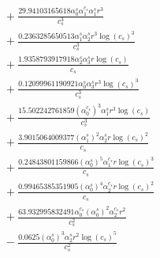\documentclass[10pt]{article}
\begin{document}
\begin{align*}
&{}  + \frac{29.94103165618 \alpha_{0}^s \alpha_{1}^{c_s} \alpha_{1}^s r^{3}}{c_{s}^{3}} \\
&{}  + \frac{0.2363285650513 \alpha_{1}^s \alpha_{2}^s r^{3} \log{\left(c_{s} \right)}^{3}}{c_{s}^{3}} \\
&{}  + \frac{1.9358793917918 \alpha_{2}^s \alpha_{3}^s r \log{\left(c_{s} \right)}}{c_{s}} \\
&{}  + \frac{0.12099961190921 \alpha_{0}^s \alpha_{3}^s r^{3} \log{\left(c_{s} \right)}^{3}}{c_{s}^{3}} \\
&{}  + \frac{15.502242761859 \left(\alpha_{0}^{c_s}\right)^{3} \alpha_{1}^s r^{3} \log{\left(c_{s} \right)}}{c_{s}^{3}} \\
&{}  + \frac{3.9015064009377 \left(\alpha_{1}^s\right)^{2} \alpha_{2}^s r \log{\left(c_{s} \right)}^{2}}{c_{s}} \\
&{}  + \frac{0.24843801159866 \left(\alpha_{0}^s\right)^{5} \alpha_{1}^{c_s} r \log{\left(c_{s} \right)}^{3}}{c_{s}} \\
&{}  + \frac{0.99465385351905 \left(\alpha_{0}^s\right)^{4} \alpha_{2}^{c_s} r \log{\left(c_{s} \right)}^{2}}{c_{s}} \\
&{}  + \frac{63.932995832491 \alpha_{0}^{c_s} \left(\alpha_{0}^s\right)^{2} \alpha_{2}^{c_s} r^{2}}{c_{s}^{2}} \\
&{}  - \frac{0.0625 \left(\alpha_{0}^s\right)^{3} \alpha_{2}^s r^{2} \log{\left(c_{s} \right)}^{5}}{c_{s}^{2}}
\end{align*}
\end{document}
